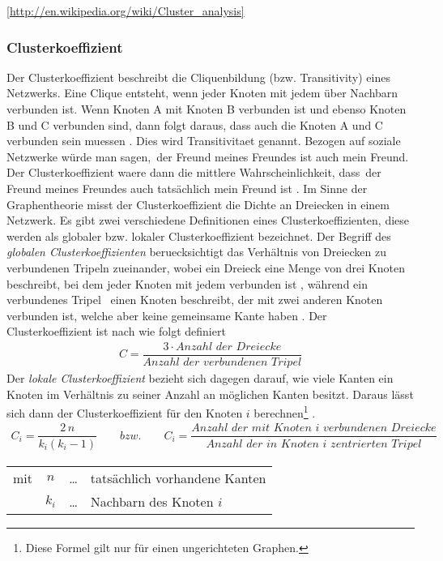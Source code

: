 \documentclass[a4paper,10pt]{scrbook}
\begin{document}
\ref{http://en.wikipedia.org/wiki/Cluster_analysis}


\subsubsection*{Clusterkoeffizient}
Der Clusterkoeffizient beschreibt die Cliquenbildung (bzw. Transitivity) eines Netzwerks. Eine Clique entsteht, wenn jeder Knoten mit jedem über Nachbarn verbunden ist. Wenn Knoten A mit Knoten B verbunden ist und ebenso Knoten B und C verbunden sind, dann folgt daraus, dass auch die Knoten A und C verbunden sein muessen \cite{Newman}. Dies wird Transitivitaet genannt. Bezogen auf soziale Netzwerke würde man sagen,\, der Freund meines Freundes ist auch mein Freund. Der Clusterkoeffizient waere dann die mittlere Wahrscheinlichkeit, dass\,   der Freund meines Freundes auch tatsächlich mein Freund ist . Im Sinne der Graphentheorie misst der Clusterkoeffizient die Dichte an Dreiecken in einem Netzwerk. Es gibt zwei verschiedene Definitionen eines Clusterkoeffizienten, diese werden als globaler bzw. lokaler Clusterkoeffizient bezeichnet. Der Begriff des \textit{globalen Clusterkoeffizienten} beruecksichtigt das Verhältnis von Dreiecken zu verbundenen Tripeln zueinander, wobei ein Dreieck eine Menge von drei Knoten beschreibt, bei dem jeder Knoten mit jedem verbunden ist \cite{Newman}, während ein verbundenes Tripel \, einen Knoten beschreibt, der mit zwei anderen Knoten verbunden ist, welche aber keine gemeinsame Kante haben \cite{Newman}. Der Clusterkoeffizient ist nach \cite{Boccaletti} wie folgt definiert
\begin{align}
	C = \dfrac{3 \cdot Anzahl \,\, der \,\, Dreiecke}{Anzahl\,\, der\,\, verbundenen\,\, Tripel}
	\label{C1}
\end{align}  
Der \textit{lokale Clusterkoeffizient} bezieht sich dagegen darauf, wie viele Kanten ein Knoten im Verhältnis zu seiner Anzahl an möglichen Kanten besitzt. Daraus lässt sich dann der Clusterkoeffizient für den Knoten $i$ berechnen\footnote{Diese Formel gilt nur für einen ungerichteten Graphen.} \cite{Watts,Newman}.
\begin{align}
C_{i} = \dfrac{2\, n}{k_{i}(k_{i} - 1)} \qquad bzw.\qquad C_{i} = \dfrac{Anzahl \,\,der \,\,mit\,\, Knoten\,\, i \,\, verbundenen \,\, Dreiecke}{Anzahl\,\, der\,\, in\,\,Knoten\,\, i\,\, zentrierten\,\, Tripel} 
\end{align}
\begin{table}[H]
\begin{tabular}{rccl}
mit  & $n$ & \ldots & tatsächlich vorhandene Kanten\\
	 & $k_{i}$ & \ldots & Nachbarn des Knoten $i$\\
\end{tabular}
\end{table}
\end{document}
